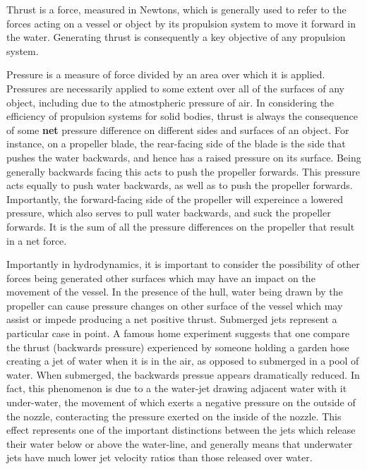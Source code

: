 \documentclass{article}\usepackage[]{graphicx}\usepackage[]{color}
\begin{document}
\begin{appendices}
Thrust is a force, measured in Newtons, which is generally used to refer to the forces acting on a vessel or object by its propulsion system to move it forward in the water.  Generating thrust is consequently a key objective of any propulsion system.

Pressure is a measure of force divided by an area over which it is applied. Pressures are necessarily applied to some extent over all of the surfaces of any object, including due to the atmostpheric pressure of air.  In considering the efficiency of propulsion systems for solid bodies, thrust is always the consequence of some \textbf{net} pressure difference on different sides and surfaces of an object.  For instance, on a propeller blade, the rear-facing side of the blade is the side that pushes the water backwards, and hence has a raised pressure on its surface.  Being generally backwards facing this acts to push the propeller forwards.  This pressure acts equally to push water backwards, as well as to push the propeller forwards.  Importantly, the forward-facing side of the propeller will expereince a lowered pressure, which also serves to pull water backwards, and suck the propeller forwards.  It is the sum of all the pressure differences on the propeller that result in a net force.

Importantly in hydrodynamics, it is important to consider the possibility of other forces being generated other surfaces which may have an impact on the movement of the vessel.  In the presence of the hull, water being drawn by the propeller can cause pressure changes on other surface of the vessel which may assist or impede producing a net positive thrust.  Submerged jets represent a particular case in point.  A famous home experiment suggests that one compare the thrust (backwards pressure) experienced by someone holding a garden hose creating a jet of water when it is in the air, as opposed to submerged in a pool of water.  When submerged, the backwards pressue appears dramatically reduced.  In fact, this phenomenon is due to a the water-jet drawing adjacent water with it under-water, the movement of which exerts a negative pressure on the outside of the nozzle, conteracting the pressure exerted on the inside of the nozzle. This effect represents one of the important distinctions between the jets which release their water below or above the water-line, and generally means that underwater jets have much lower jet velocity ratios than those released over water.


\end{appendices}
\end{document}
